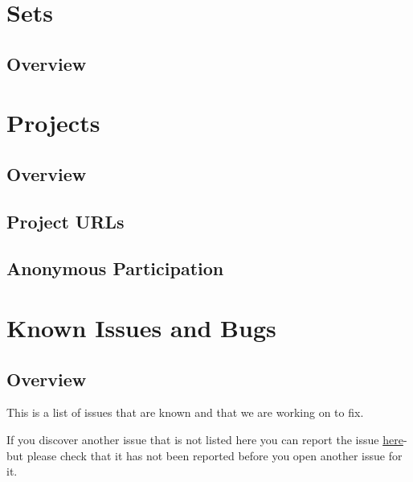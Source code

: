 \documentclass[]{book}
\begin{document}
\hypertarget{sets}{%
\chapter{Sets}\label{sets}}

\hypertarget{overview-5}{%
\section{Overview}\label{overview-5}}

\hypertarget{projects}{%
\chapter{Projects}\label{projects}}

\hypertarget{overview-6}{%
\section{Overview}\label{overview-6}}

\hypertarget{project-urls}{%
\section{Project URLs}\label{project-urls}}

\hypertarget{anon}{%
\section{Anonymous Participation}\label{anon}}

\hypertarget{knownissues}{%
\chapter*{Known Issues and Bugs}\label{knownissues}}

\hypertarget{overview-7}{%
\section*{Overview}\label{overview-7}}

This is a list of issues that are known and that we are working on to fix.

If you discover another issue that is not listed here you can report the issue \href{https://github.com/RebeccaJLai/exp_manual/issues}{here}- but please check that it has not been reported before you open another issue for it.
\end{document}
